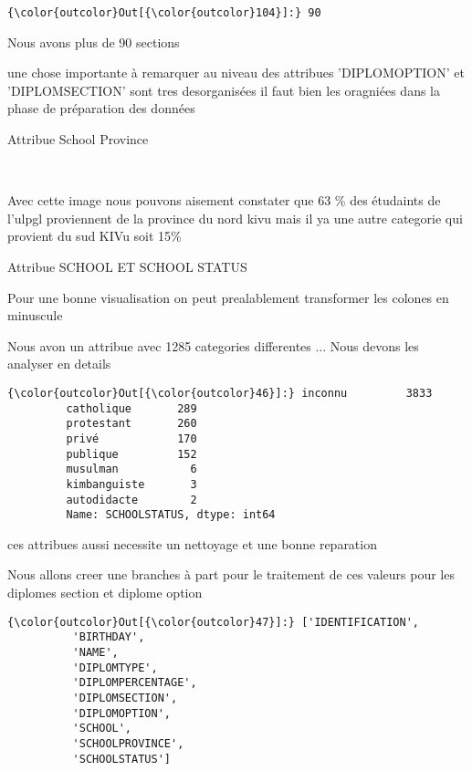 \documentclass[11pt]{article}
\begin{document}
            \begin{Verbatim}[commandchars=\\\{\}]
{\color{outcolor}Out[{\color{outcolor}104}]:} 90
\end{Verbatim}
        
    Nous avons plus de 90 sections

    une chose importante à remarquer au niveau des attribues 'DIPLOMOPTION'
et 'DIPLOMSECTION' sont tres desorganisées il faut bien les oragniées
dans la phase de préparation des données

    Attribue School Province

    \begin{center}
    \end{center}
    { \hspace*{\fill} \\}
    
    Avec cette image nous pouvons aisement constater que 63 \% des étudaints
de l'ulpgl proviennent de la province du nord kivu mais il ya une autre
categorie qui provient du sud KIVu soit 15\%

    Attribue SCHOOL ET SCHOOL STATUS

    Pour une bonne visualisation on peut prealablement transformer les
colones en minuscule

    Nous avon un attribue avec 1285 categories differentes ... Nous devons
les analyser en details

            \begin{Verbatim}[commandchars=\\\{\}]
{\color{outcolor}Out[{\color{outcolor}46}]:} inconnu         3833
         catholique       289
         protestant       260
         privé            170
         publique         152
         musulman           6
         kimbanguiste       3
         autodidacte        2
         Name: SCHOOLSTATUS, dtype: int64
\end{Verbatim}
        
    ces attribues aussi necessite un nettoyage et une bonne reparation

    Nous allons creer une branches à part pour le traitement de ces valeurs
pour les diplomes section et diplome option

            \begin{Verbatim}[commandchars=\\\{\}]
{\color{outcolor}Out[{\color{outcolor}47}]:} ['IDENTIFICATION',
          'BIRTHDAY',
          'NAME',
          'DIPLOMTYPE',
          'DIPLOMPERCENTAGE',
          'DIPLOMSECTION',
          'DIPLOMOPTION',
          'SCHOOL',
          'SCHOOLPROVINCE',
          'SCHOOLSTATUS']
\end{Verbatim}
        
\end{document}
